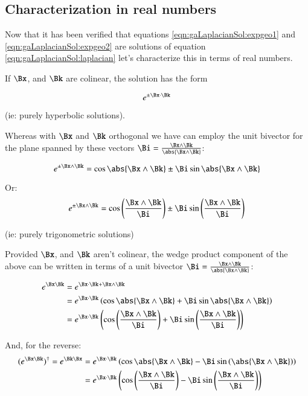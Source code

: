 \subsection{Characterization in real numbers }

Now that it has been verified that equations \ref{eqn:gaLaplacianSol:expgeo1} and \ref{eqn:gaLaplacianSol:expgeo2} are solutions
of equation \ref{eqn:gaLaplacianSol:laplacian} let's characterize this in terms of real numbers.

If $\Bx$, and $\Bk$ are colinear, the solution has the form

\begin{equation}
e^{\pm\Bx \cdot \Bk}
\end{equation}

(ie: purely hyperbolic solutions).

Whereas with $\Bx$ and $\Bk$ orthogonal we have can employ the unit bivector for the plane spanned by these vectors
$\Bi = \frac{\Bx \wedge \Bk}{\abs{\Bx \wedge \Bk}}$:

\begin{equation}
e^{\pm\Bx \wedge \Bk} = \cos\abs{\Bx \wedge \Bk} \pm \Bi\sin\abs{\Bx \wedge \Bk}
\end{equation}

Or:
\begin{equation}
e^{\pm\Bx \wedge \Bk} = \cos\left(\frac{\Bx \wedge \Bk}{\Bi}\right) \pm \Bi\sin\left(\frac{\Bx \wedge \Bk}{\Bi}\right)
\end{equation}

(ie: purely trigonometric solutions)

Provided $\Bx$, and $\Bk$ aren't colinear, the wedge product component of the above can be written in terms of a unit bivector
$\Bi = \frac{\Bx \wedge \Bk}{\abs{\Bx \wedge \Bk}}$:

\begin{align*}
e^{\Bx\Bk} &= e^{\Bx \cdot \Bk + \Bx \wedge \Bk} \\
&= e^{\Bx \cdot \Bk} \left( \cos{\abs{\Bx \wedge \Bk}} + \Bi \sin{\abs{\Bx \wedge \Bk}} \right) \\
&= e^{\Bx \cdot \Bk} \left( \cos\left(\frac{\Bx \wedge \Bk}{\Bi}\right) + \Bi \sin\left(\frac{\Bx \wedge \Bk}{\Bi}\right) \right) \\
\end{align*}

And, for the reverse:
\begin{align*}
(e^{\Bx\Bk})^\dagger = e^{\Bk\Bx}
&= e^{\Bx \cdot \Bk} \left( \cos{\abs{\Bx \wedge \Bk}} - \Bi \sin\left(\abs{\Bx \wedge \Bk}\right) \right) \\
&= e^{\Bx \cdot \Bk} \left( \cos\left(\frac{\Bx \wedge \Bk}{\Bi}\right) - \Bi \sin\left(\frac{\Bx \wedge \Bk}{\Bi}\right) \right) \\
\end{align*}

